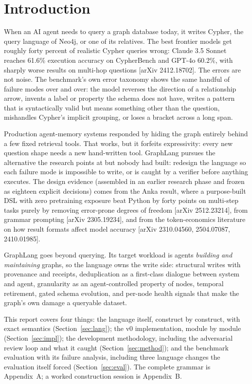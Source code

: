 \documentclass[11pt]{article}
\begin{document}
\tableofcontents
\newpage

\section{Introduction}

When an AI agent needs to query a graph database today, it writes Cypher, the query language of Neo4j, or one of its relatives. The best frontier models get roughly forty percent of realistic Cypher queries wrong: Claude 3.5 Sonnet reaches 61.6\% execution accuracy on CypherBench and GPT-4o 60.2\%, with sharply worse results on multi-hop questions [arXiv 2412.18702]. The errors are not noise. The benchmark's own error taxonomy shows the same handful of failure modes over and over: the model reverses the direction of a relationship arrow, invents a label or property the schema does not have, writes a pattern that is syntactically valid but means something other than the question, mishandles Cypher's implicit grouping, or loses a bracket across a long span.

Production agent-memory systems responded by hiding the graph entirely behind a few fixed retrieval tools. That works, but it forfeits expressivity: every new question shape needs a new hand-written tool. GraphLang pursues the alternative the research points at but nobody had built: redesign the language so each failure mode is impossible to write, or is caught by a verifier before anything executes. The design evidence (assembled in an earlier research phase and frozen as eighteen explicit decisions) comes from the Anka result, where a purpose-built DSL with zero pretraining exposure beat Python by forty points on multi-step tasks purely by removing error-prone degrees of freedom [arXiv 2512.23214], from grammar prompting [arXiv 2305.19234], and from the token-economics literature on how result formats affect model accuracy [arXiv 2310.04560, 2504.07087, 2410.01985].

GraphLang goes beyond querying. Its target workload is agents \emph{building and maintaining} graphs, so the language owns the write side: structural writes with provenance and receipts, deduplication as a first-class dialogue between system and agent, granularity as an agent-controlled property of nodes, temporal retirement, gated schema evolution, and per-node health signals that make the graph's own damage a queryable dataset.

This report covers four things: the language itself, construct by construct, with exact semantics (Section~\ref{sec:lang}); the v0 implementation, module by module (Section~\ref{sec:impl}); the development methodology, including the adversarial review loop and what it caught (Section~\ref{sec:method}); and the benchmark evaluation with its failure analysis, including three language changes the evaluation itself forced (Section~\ref{sec:eval}). The complete grammar is Appendix~A; a worked construction session is Appendix~B.
\end{document}
